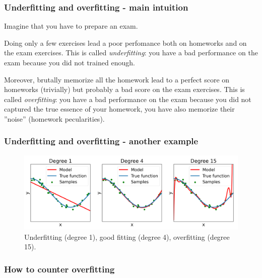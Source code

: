 \documentclass{beamer}
\begin{document}
	\begin{frame}
		\frametitle{Underfitting and overfitting - main intuition}
		
		Imagine that you have to prepare an exam. 
		
		\vspace{5mm}
		
		Doing only a few exercises lead a poor perfomance both on homeworks and on the exam exercises. This is called \textsl{underfitting}: you have a bad performance on the exam because you did not trained enough.
		
		\vspace{5mm}
		
		Moreover, brutally memorize all the homework lead to a perfect score on homeworks (trivially) but probably a bad score on the exam exercises. This is called \textsl{overfitting}: you have a bad performance on the exam because you did not captured the true essence of your homework, you have also memorize their ''noise'' (homework pecularities).
	\end{frame}

	\begin{frame}
		\frametitle{Underfitting and overfitting - another example}
		\begin{figure}
			\centering
			\includegraphics[scale=0.35]{images/overfitting_poly}
			\caption{Underfitting (degree 1), good fitting (degree 4), overfitting (degree 15).}
		\end{figure}
	\end{frame}

	\begin{frame}
		\frametitle{How to counter overfitting}
	\end{frame}
\end{document}
